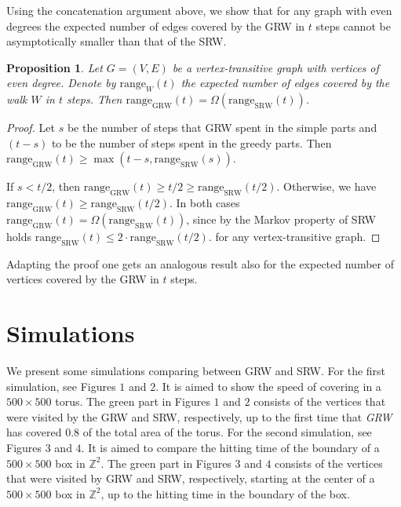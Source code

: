 \documentclass[12pt,a4paper]{article}
\newcommand{\0}{{\bf 0}}
\newcommand{\Z}{{\mathbb Z}}
\newtheorem{proposition}[theorem]{Proposition}
\newenvironment{remark}{\noindent{\bf Remark}\hspace*{1em}}{\bigskip}
\begin{document}
        Using the concatenation argument above,
        we show that for any graph with even degrees the expected number of edges covered by the GRW in $t$ steps
        cannot be asymptotically smaller than that of the SRW.

\begin{proposition}
    Let $G = (V,E)$ be a vertex-transitive graph with vertices of even degree.
    Denote by $\textrm{range}_W(t)$ the expected number of edges covered by the walk $W$ in $t$ steps.
    Then $\textrm{range}_{\textrm{GRW}}(t) = \Omega (\textrm{range}_{\textrm{SRW}}(t))$.
\end{proposition}
\begin{proof}
        Let $s$ be the number of steps that GRW spent in the simple parts
        and $(t-s)$ to be the number of steps spent in the greedy parts.
        Then $\textrm{range}_{\textrm{GRW}}(t) \geq \max(t-s, \textrm{range}_{\textrm{SRW}}(s))$.

        If $s < t/2$, then $\textrm{range}_{\textrm{GRW}}(t) \geq t/2 \geq \textrm{range}_{\textrm{SRW}}(t/2)$.
        Otherwise, we have $\textrm{range}_{\textrm{GRW}}(t) \geq \textrm{range}_{\textrm{SRW}}(t/2)$.
        In both cases $\textrm{range}_{\textrm{GRW}}(t) = \Omega (\textrm{range}_{\textrm{SRW}}(t))$,
        since by the Markov property of SRW holds $\textrm{range}_{\textrm{SRW}}(t) \leq 2 \cdot \textrm{range}_{\textrm{SRW}}(t/2)$.
        for any vertex-transitive graph.
\end{proof}

\begin{remark}
    Adapting the proof one gets an analogous result also for
    the expected number of vertices covered by the GRW in $t$ steps.
\end{remark}

\section{Simulations}\label{sec:simulations}
    We present some simulations comparing between GRW and SRW.
    For the first simulation, see Figures $1$ and $2$. It is aimed to show the speed of covering in a $500\times 500$ torus.
    The green part in Figures $1$ and $2$ consists of the vertices that were visited by the GRW and SRW, respectively, up to the first time that \emph{GRW} has covered $0.8$ of the total area of the torus.
    For the second simulation, see Figures $3$ and $4$. It is aimed to compare the hitting time of the boundary of a $500\times 500$ box in $\Z^2$.
    The green part in Figures $3$ and $4$ consists of the vertices that were visited by GRW and SRW, respectively, starting at the center of a $500\times 500$ box in $\Z^2$, up to the hitting time in the boundary of the box.
\end{document}
